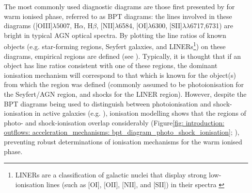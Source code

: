 The most commonly used diagnostic diagrams are those first presented by \citet{Baldwin1981} for warm ionised phase, referred to as BPT diagrams: the lines involved in these diagrams ([OIII]$\lambda5007$, H$\alpha$, H$\beta$, [NII]$\lambda$6584, [OI]$\lambda$6300, [SII]$\lambda\lambda$6717,6731) are bright in typical AGN optical spectra. By plotting the line ratios of known objects (e.g. star-forming regions, Seyfert galaxies, and LINERs\footnote{LINERs are a classification of galactic nuclei that display strong low-ionisation lines (such as [OI], [OII], [NII], and [SII]) in their spectra \citep{Heckman1980}}) on these diagrams, empirical regions are defined (see \citealt{Kewley2006}). Typically, it is thought that if an object has line ratios consistent with one of these regions, the dominant ionisation mechanism will correspond to that which is known for the object(s) from which the region was defined (commonly assumed to be photoionisation for the Seyfert/AGN region, and shocks for the LINER region). However, despite the BPT diagrams being used to distinguish between photoionisation and shock-ionisation in active galaxies (e.g. \citealt{Mingozzi2019, Venturi2021, Venturi2023, Revalski2021}), ionisation modelling shows that the regions of photo- and shock-ionisation overlap considerably (Figure\;\ref{fig: introduction: outflows: acceleration_mechanisms: bpt_diagram_photo_shock_ionisation}; \citealt{Dopita1995, Dopita1996, Allen2008, Ji2020}), preventing robust determinations of ionisation mechanisms for the warm ionised phase. 

